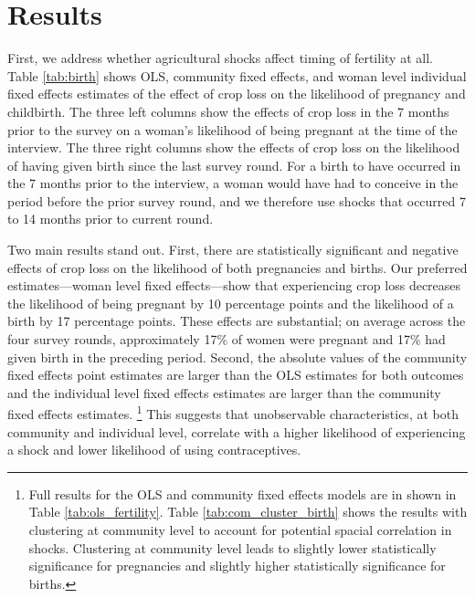 \documentclass[letterpaper,12pt]{article}
\begin{document}
\section{Results}


First, we address whether agricultural shocks affect timing of fertility at all.
Table \ref{tab:birth} shows OLS, community fixed effects, and woman level individual 
fixed effects estimates of the effect of crop loss on the likelihood of pregnancy 
and childbirth.
The three left columns show the effects of crop loss in the 7 months prior to the
survey on a woman's likelihood of being pregnant at the time of the interview.
The three right columns show the effects of crop loss on the likelihood of having given 
birth since the last survey round. 
For a birth to have occurred in the 7 months prior to the interview, a woman would have
had to conceive in the period before the prior survey round, and we therefore use shocks
that occurred 7 to 14 months prior to current round.





Two main results stand out.
First, there are statistically significant and negative effects of crop loss on the
likelihood of both pregnancies and births.
Our preferred estimates---woman level fixed effects---show that experiencing 
crop loss decreases the likelihood of being pregnant by 10 percentage points 
and the likelihood of a birth by 17 percentage points.
These effects are substantial; on average across the four survey rounds, approximately 
17\% of women were pregnant and 17\% had given birth in the preceding period. 
Second, the absolute values of the community fixed effects point estimates are 
larger than the OLS estimates for both outcomes and the individual level
fixed effects estimates are larger than the community fixed effects estimates.%
\footnote{
Full results for the OLS and community fixed effects models are in shown in 
Table \ref{tab:ols_fertility}.
Table \ref{tab:com_cluster_birth} shows the results with clustering at community level
to account for potential spacial correlation in shocks.
Clustering at community level leads to slightly lower statistically significance 
for pregnancies and slightly higher statistically significance for births.
}
This suggests that unobservable characteristics, at both community
and individual level, correlate with a higher likelihood of experiencing 
a shock and lower likelihood of using contraceptives.
\end{document}
